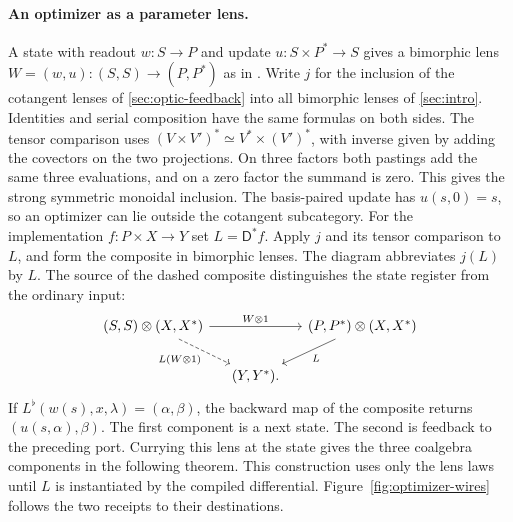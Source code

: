 \documentclass[11pt,a4paper]{article}
\theoremstyle{definition}
\theoremstyle{remark}\newaliascnt{remark}{theorem}
\numberwithin{equation}{section}
\begin{document}
\paragraph{An optimizer as a parameter lens.}
A state with readout \(w:S\to P\) and update \(u:S\times P^*\to S\) gives a bimorphic lens $W=(w,u):(S,S)\to(P,P^*)$ as in \cite[\S3]{lens:deep}. Write $j$ for the inclusion of the cotangent lenses of \cref{sec:optic-feedback} into all bimorphic lenses of \cref{sec:intro}. Identities and serial composition have the same formulas on both sides. The tensor comparison uses $(V\times V')^*\simeq V^*\times(V')^*$, with inverse given by adding the covectors on the two projections. On three factors both pastings add the same three evaluations, and on a zero factor the summand is zero. This gives the strong symmetric monoidal inclusion. The basis-paired update has $u(s,0)=s$, so an optimizer can lie outside the cotangent subcategory. For the implementation $f:P\times X\to Y$ set $L=\mathsf D^*f$. Apply $j$ and its tensor comparison to $L$, and form the composite in bimorphic lenses. The diagram abbreviates $j(L)$ by $L$. The source of the dashed composite distinguishes the state register from the ordinary input:
\[
\begin{tikzcd}[column sep=small]
 (S,S)\otimes(X,X^*)\arrow[rr,"W\otimes1"]\arrow[dr,dashed,"L(W\otimes1)"']&&
 (P,P^*)\otimes(X,X^*)\arrow[dl,"L"]\\
 &(Y,Y^*) .
\end{tikzcd}
\]
If \(L^\flat(w(s),x,\lambda)=(\alpha,\beta)\), the backward map of the composite returns \((u(s,\alpha),\beta)\). The first component is a next state. The second is feedback to the preceding port. Currying this lens at the state gives the three coalgebra components in the following theorem. This construction uses only the lens laws until \(L\) is instantiated by the compiled differential. Figure~\ref{fig:optimizer-wires} follows the two receipts to their destinations.
\end{document}
